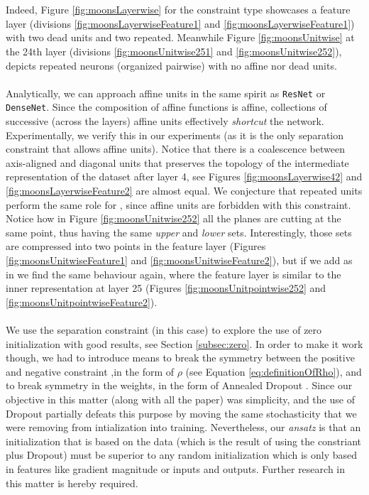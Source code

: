\\\\
Indeed, Figure \ref{fig:moonsLayerwise} for the \SepLayer constraint type showcases a feature layer (divisions \ref{fig:moonsLayerwiseFeature1} and \ref{fig:moonsLayerwiseFeature1}) with two dead units and two repeated. Meanwhile Figure \ref{fig:moonsUnitwise} at the 24th layer (divisions \ref{fig:moonsUnitwise251} and \ref{fig:moonsUnitwise252}), depicts repeated neurons (organized pairwise) with no affine nor dead units. 
\\\\
Analytically, we can approach affine units in the same spirit as \texttt{ResNet} \cite{resnet} or \texttt{DenseNet}\cite{densenet}. Since the composition of affine functions is affine, collections of successive (across the layers) affine units effectively \emph{shortcut} the network. Experimentally, we verify this in our \SepLayer experiments (as it is the only separation constraint that allows affine units). Notice that there is a coalescence between axis-aligned and diagonal units that preserves the topology of the intermediate representation of the dataset after layer 4, see Figures \ref{fig:moonsLayerwise42} and \ref{fig:moonsLayerwiseFeature2} are almost equal. We conjecture that repeated units perform the same role for \SepUnit, since affine units are forbidden with this constraint. Notice how in Figure \ref{fig:moonsUnitwise252} all the planes are cutting at the same point, thus having the same \emph{upper} and \emph{lower} sets. Interestingly, those sets are compressed into two points in the feature layer (Figures \ref{fig:moonsUnitwiseFeature1} and \ref{fig:moonsUnitwiseFeature2}), but if we add \SepPoint as in \SepUnitPoint we find the same behaviour again, where the feature layer is similar to the inner representation at layer 25 (Figures \ref{fig:moonsUnitpointwise252} and \ref{fig:moonsUnitpointwiseFeature2}). 
\\\\
We use the separation constraint (\SepUnitPoint in this case) to explore the use of zero initialization with good results, see Section \ref{subsec:zero}. In order to make it work though, we had to introduce  means to break the symmetry between the positive and negative constraint ,in the form of $\rho$ (see Equation \ref{eq:definitionOfRho}), and to break symmetry in the weights, in the form of Annealed Dropout \cite{dropoutAnnealing}. Since our objective in this matter (along with all the paper) was simplicity, and the use of Dropout partially defeats this purpose by moving the same stochasticity that we were removing from intialization into training. Nevertheless, our \emph{ansatz} is that an initialization that is based on the data (which is the result of using the constriant plus Dropout) must be superior to any random initialization which is only based in features like gradient magnitude or inputs and outputs. Further research in this matter is hereby required.






